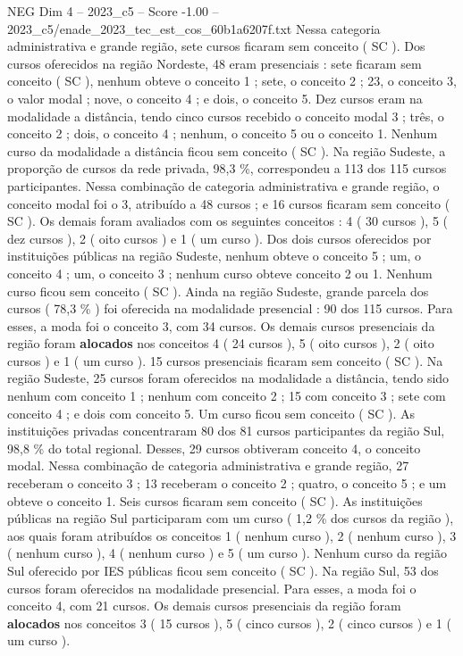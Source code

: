 \begin{textsample}{NEG Dim 4 – 2023\_c5 – Score -1.00 – 2023\_c5/enade\_2023\_tec\_est\_cos\_60b1a6207f.txt}
Nessa categoria administrativa e grande região, sete cursos ficaram sem conceito ( SC ).
Dos cursos oferecidos na região Nordeste, 48 eram presenciais : sete ficaram sem conceito ( SC ), nenhum obteve o conceito 1 ; sete, o conceito 2 ; 23, o conceito 3, o valor modal ; nove, o conceito 4 ; e dois, o conceito 5.
Dez cursos eram na modalidade a distância, tendo cinco cursos recebido o conceito modal 3 ; três, o conceito 2 ; dois, o conceito 4 ; nenhum, o conceito 5 ou o conceito 1.
Nenhum curso da modalidade a distância ficou sem conceito ( SC ).
Na região Sudeste, a proporção de cursos da rede privada, 98,3 \%, correspondeu a 113 dos 115 cursos participantes.
Nessa combinação de categoria administrativa e grande região, o conceito modal foi o 3, atribuído a 48 cursos ; e 16 cursos ficaram sem conceito ( SC ).
Os demais foram avaliados com os seguintes conceitos : 4 ( 30 cursos ), 5 ( dez cursos ), 2 ( oito cursos ) e 1 ( um curso ).
Dos dois cursos oferecidos por instituições públicas na região Sudeste, nenhum obteve o conceito 5 ; um, o conceito 4 ; um, o conceito 3 ; nenhum curso obteve conceito 2 ou 1.
Nenhum curso ficou sem conceito ( SC ).
Ainda na região Sudeste, grande parcela dos cursos ( 78,3 \% ) foi oferecida na modalidade presencial : 90 dos 115 cursos.
Para esses, a moda foi o conceito 3, com 34 cursos.
Os demais cursos presenciais da região foram \textbf{alocados} nos conceitos 4 ( 24 cursos ), 5 ( oito cursos ), 2 ( oito cursos ) e 1 ( um curso ). 15 cursos presenciais ficaram sem conceito ( SC ).
Na região Sudeste, 25 cursos foram oferecidos na modalidade a distância, tendo sido nenhum com conceito 1 ; nenhum com conceito 2 ; 15 com conceito 3 ; sete com conceito 4 ; e dois com conceito 5.
Um curso ficou sem conceito ( SC ).
As instituições privadas concentraram 80 dos 81 cursos participantes da região Sul, 98,8 \% do total regional.
Desses, 29 cursos obtiveram conceito 4, o conceito modal.
Nessa combinação de categoria administrativa e grande região, 27 receberam o conceito 3 ; 13 receberam o conceito 2 ; quatro, o conceito 5 ; e um obteve o conceito 1.
Seis cursos ficaram sem conceito ( SC ).
As instituições públicas na região Sul participaram com um curso ( 1,2 \% dos cursos da região ), aos quais foram atribuídos os conceitos 1 ( nenhum curso ), 2 ( nenhum curso ), 3 ( nenhum curso ), 4 ( nenhum curso ) e 5 ( um curso ).
Nenhum curso da região Sul oferecido por IES públicas ficou sem conceito ( SC ).
Na região Sul, 53 dos cursos foram oferecidos na modalidade presencial.
Para esses, a moda foi o conceito 4, com 21 cursos.
Os demais cursos presenciais da região foram \textbf{alocados} nos conceitos 3 ( 15 cursos ), 5 ( cinco cursos ), 2 ( cinco cursos ) e 1 ( um curso ).

\end{textsample}
